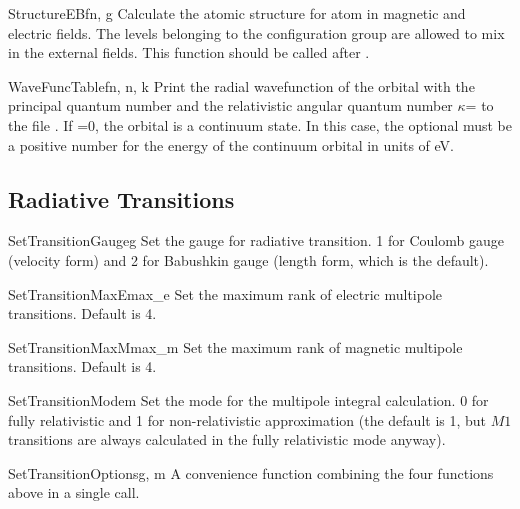 \begin{fundesc}{StructureEB}{fn, g}
Calculate the atomic structure for atom in magnetic and electric fields. The
levels belonging to the configuration group  are allowed to mix in the
external fields. This function should be called after .
\end{fundesc}

\begin{fundesc}{WaveFuncTable}{fn, n, k}
Print the radial wavefunction of the orbital with the principal quantum number
 and the relativistic angular quantum number $\kappa$= to the file
. If =0, the orbital is a continuum state. In this case, the
optional  must be a positive number for the energy of the continuum
orbital in units of eV.
\end{fundesc}


\subsection{Radiative Transitions}

\begin{fundesc}{SetTransitionGauge}{g}
Set the gauge for radiative transition. 1 for Coulomb gauge (velocity form) and
2 for Babushkin gauge (length form, which is the default).
\end{fundesc}

\begin{fundesc}{SetTransitionMaxE}{max\_e}
Set the maximum rank of electric multipole transitions. Default is 4.
\end{fundesc}

\begin{fundesc}{SetTransitionMaxM}{max\_m}
Set the maximum rank of magnetic multipole transitions. Default is 4.
\end{fundesc}

\begin{fundesc}{SetTransitionMode}{m}
Set the mode for the multipole integral calculation. 0 for fully relativistic
and 1 for non-relativistic approximation (the default is 1, but $M1$ transitions
are always calculated in the fully relativistic mode anyway).
\end{fundesc}

\begin{fundesc}{SetTransitionOptions}{g, m}
A convenience function combining the four functions above in a single call.
\end{fundesc}

